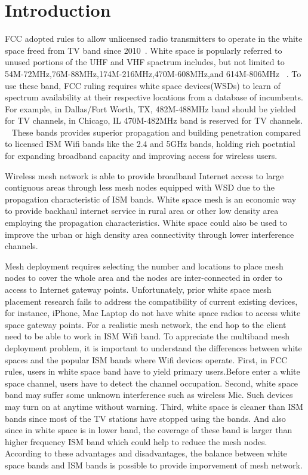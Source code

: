 
\section{Introduction}
\label{sec:introduction}

FCC adopted rules to allow unlicensed radio transmitters to operate in the white space freed from TV band since 2010~\cite{fccwhitespace}. White space is popularly referred to unused portions of the UHF and VHF spactrum includes, but not limited to 54M-72MHz,76M-88MHz,174M-216MHz,470M-608MHz,and 614M-806MHz ~\cite{whitespacewiki}.
To use these band, FCC ruling requires white space devices(WSDs) to learn of spectrum availability at their respective locations from a database of incumbents. For example, in Dallas/Fort Worth, TX, 482M-488MHz band should be yielded for TV channels, in Chicago, IL 470M-482MHz band is reserved for TV channels. ~\cite{broadband}
 These bands provides superior propagation and building penetration compared to licensed ISM Wifi bands like the 2.4 and 5GHz bands, holding rich poetntial for expanding broadband capacity and improving access for wireless users.

Wireless mesh network is able to provide broadband Internet access to large contiguous areas through less mesh nodes equipped with WSD due to the propagation characteristic of ISM bands. White space mesh is an economic way to provide backhaul internet service in rural area or other low density area employing the propagation characteristics.
White space could also be used to improve the urban or high density area connectivity through lower interference channels. 

Mesh deployment requires selecting the number and locations to place mesh nodes to cover the whole area and the nodes are inter-connected in order to access to Internet gateway points.
Unfortunately, prior white space mesh placement research fails to address the compatibility of current existing devices, for instance, iPhone, Mac Laptop do not have white space radios to access white space gateway points. For a realistic mesh network, the end hop to the client need to be able to work in ISM Wifi band. 
To appreciate the multiband mesh deployment problem, it is important to understand the differences between white spaces and the popular ISM bands where Wifi devices operate. First, in FCC rules, users in white space band have to yield primary users.Before enter a white space channel, users have to detect the channel occupation. Second, white space band may suffer some unknown interference such as wireless Mic. Such devices may turn on at anytime without warning. Third, white space is cleaner than ISM bands since most of the TV stations have stopped using the bands. And also since in white space is in lower band, the coverage of these band is larger than higher frequency ISM band which could help to reduce the mesh nodes. According to these advantages and disadvantages, the balance between white space bands and ISM bands is possible to provide imporvement of mesh network. 


